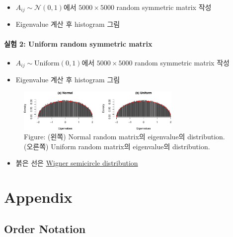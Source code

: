 \documentclass[
  13pt,
  letterpaper,
  DIV=11,
  numbers=noendperiod]{scrreprt}
\providecommand{\tightlist}{%
  \setlength{\itemsep}{0pt}\setlength{\parskip}{0pt}}\usepackage{longtable,booktabs,array}
\theoremstyle{plain}
\theoremstyle{definition}
\theoremstyle{definition}
\theoremstyle{plain}
\theoremstyle{definition}
\theoremstyle{plain}
\theoremstyle{remark}
\begin{document}
\begin{itemize}
\item
  \(A_{ij} \sim \mathcal{N}(0,1)\)에서 \(5000\times 5000\) random
  symmetric matrix 작성
\item
  Eigenvalue 계산 후 histogram 그림
\end{itemize}

\subsection{실험 2: Uniform random symmetric
matrix}\label{uxc2e4uxd5d8-2-uniform-random-symmetric-matrix}

\begin{itemize}
\item
  \(A_{ij} \sim \text{Uniform}(0,1)\)에서 \(5000\times 5000\) random
  symmetric matrix 작성
\item
  Eigenvalue 계산 후 histogram 그림
\end{itemize}

\begin{figure}[th]

{\centering \includegraphics[width=0.7\textwidth,height=\textheight]{rmatrices_files/figure-pdf/unnamed-chunk-2-1.pdf}

}

\caption{Figure: (왼쪽) Normal random matrix의 eigenvalue의
distribution. (오른쪽) Uniform random matrix의 eigenvalue의
distribution.}

\end{figure}%

\begin{itemize}
\tightlist
\item
  붉은 선은
  \href{https://en.wikipedia.org/wiki/Wigner_semicircle_distribution}{Wigner
  semicircle distribution}
\end{itemize}

\part{Appendix}

\chapter{Order Notation}\label{order-notation}
\end{document}
